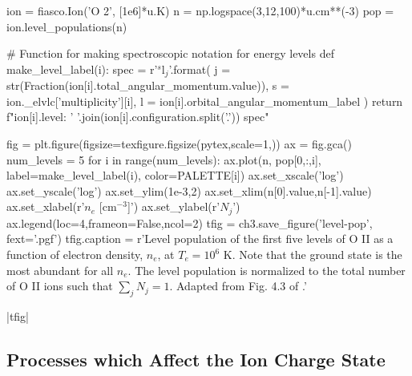 \begin{pycode}[chapter3]
ion = fiasco.Ion('O 2', [1e6]*u.K)
n = np.logspace(3,12,100)*u.cm**(-3)
pop = ion.level_populations(n)

# Function for making spectroscopic notation for energy levels
def make_level_label(i):
    spec = r'$^{s}\mathrm{{{l}}}_{{{j}}}$'.format(
        j = str(Fraction(ion[i].total_angular_momentum.value)),
        s = ion._elvlc['multiplicity'][i],
        l = ion[i].orbital_angular_momentum_label
    )
    return f"{ion[i].level}: {' '.join(ion[i].configuration.split('.'))} {spec}"

fig = plt.figure(figsize=texfigure.figsize(pytex,scale=1,))
ax = fig.gca()
num_levels = 5
for i in range(num_levels):
    ax.plot(n, pop[0,:,i], label=make_level_label(i), color=PALETTE[i])
ax.set_xscale('log')
ax.set_yscale('log')
ax.set_ylim(1e-3,2)
ax.set_xlim(n[0].value,n[-1].value)
ax.set_xlabel(r'$n_e$ [cm$^{-3}$]')
ax.set_ylabel(r'$N_j$')
ax.legend(loc=4,frameon=False,ncol=2)
tfig = ch3.save_figure('level-pop', fext='.pgf')
tfig.caption = r'Level population of the first five levels of O II as a function of electron density, $n_e$, at $T_e=10^6$ K. Note that the ground state is the most abundant for all $n_e$. The level population is normalized to the total number of O II ions such that $\sum_jN_j=1$. Adapted from Fig. 4.3 of \citet{phillips_ultraviolet_2008}.'
\end{pycode}
\py[chapter3]|tfig|

\subsection{Processes which Affect the Ion Charge State}\label{subsec:ionization_recombination}

